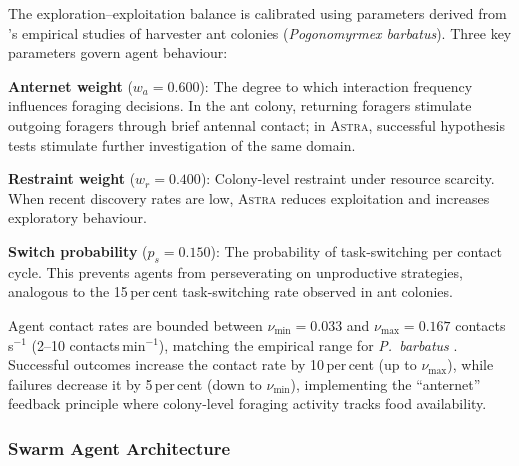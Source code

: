 \documentclass[usenatbib]{rasti}
\newcommand{\astra}{\textsc{Astra}\xspace}
\begin{document}
The exploration--exploitation balance is calibrated using parameters derived from \citet{Gordon2010}'s empirical studies of harvester ant colonies (\textit{Pogonomyrmex barbatus}).
Three key parameters govern agent behaviour:
\begin{description}
  \item \textbf{Anternet weight} ($w_a = 0.600$): The degree to which interaction frequency influences foraging decisions. In the ant colony, returning foragers stimulate outgoing foragers through brief antennal contact; in \astra, successful hypothesis tests stimulate further investigation of the same domain.
  \item \textbf{Restraint weight} ($w_r = 0.400$): Colony-level restraint under resource scarcity. When recent discovery rates are low, \astra reduces exploitation and increases exploratory behaviour.
  \item \textbf{Switch probability} ($p_s = 0.150$): The probability of task-switching per contact cycle. This prevents agents from perseverating on unproductive strategies, analogous to the 15\,per\,cent task-switching rate observed in ant colonies.
\end{description}
Agent contact rates are bounded between $\nu_{\min} = 0.033$ and $\nu_{\max} = 0.167$ contacts\,s$^{-1}$ (2--10 contacts\,min$^{-1}$), matching the empirical range for \textit{P.\ barbatus} \citep{Gordon2010}.
Successful outcomes increase the contact rate by 10\,per\,cent (up to $\nu_{\max}$), while failures decrease it by 5\,per\,cent (down to $\nu_{\min}$), implementing the ``anternet'' feedback principle where colony-level foraging activity tracks food availability.

\subsubsection{Swarm Agent Architecture}
\end{document}
